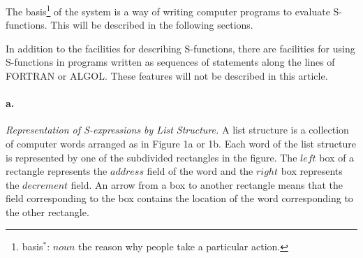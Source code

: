 \documentclass[11pt, a4paper]{article}
\begin{document}
The
basis\footnote{basis$^*$: $noun$ the reason why people take a particular
  action.}
of the system is a way of writing computer programs to evaluate
S-functions. This will be described in the following sections.

In addition to the facilities for describing S-functions, there are facilities
for using S-functions in programs written as sequences of statements along the
lines of FORTRAN or ALGOL. These features will not be described in this
article.

\paragraph{a.}\textit{Representation of S-expressions by List Structure.}
A list structure is a collection of computer words arranged as in Figure 1a or
1b. Each word of the list structure is represented by one of the subdivided
rectangles in the figure. The $left$ box of a rectangle represents the $address$
field of the word and the $right$ box represents the $decrement$ field. An arrow
from a box to another rectangle means that the field corresponding to the box
contains the location of the word corresponding to the other rectangle.
\end{document}
